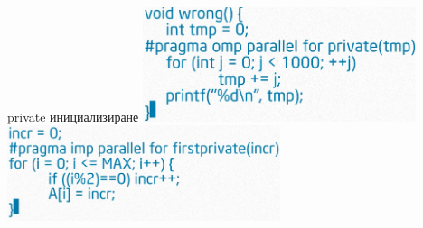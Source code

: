 \documentclass{beamer}
\begin{document}
\begin{frame}{private инициализиране}
\includegraphics[width=0.6\textwidth]{private-init.png} \pause
\includegraphics[width=0.6\textwidth]{private-init2.png}
\end{frame}
\end{document}

